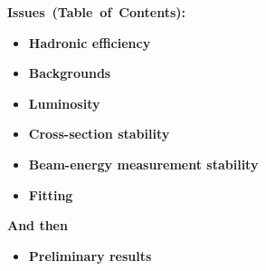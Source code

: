 \documentclass[landscape]{article}
\newenvironment{slide}[1][ ]{\mbox{\bf #1 } \vfill}{\vfill \mbox{ } \pagebreak}
\begin{document}
\begin{slide}[Issues (Table of Contents):]
  \Huge

  \vspace{-3 cm}
  \begin{center}
    \begin{minipage}{19 cm}
      \begin{itemize}\setlength{\itemsep}{0.5 cm}
	\item {\bf Hadronic efficiency}
        \item {\bf Backgrounds}
	\item {\bf Luminosity}
	\item {\bf Cross-section stability}
	\item {\bf Beam-energy measurement stability}
        \item {\bf Fitting}
      \end{itemize}
    \end{minipage}
  \end{center}

  \vspace{1.5 cm}
  {\bf \huge And then}
  \begin{center}
    \begin{minipage}{19 cm}

      \begin{itemize}\setlength{\itemsep}{0.5 cm}
        \item {\bf Preliminary results}
      \end{itemize}
    \end{minipage}
  \end{center}
\end{slide}
\end{document}
